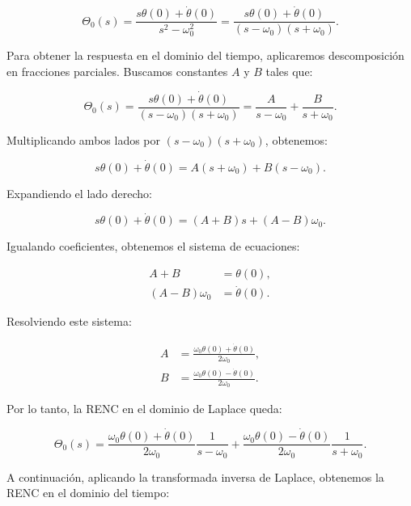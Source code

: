 \documentclass[
  11pt,
  letterpaper,
   addpoints,
   answers
  ]{exam}
\begin{document}
\begin{questions}
\begin{solution}
\begin{equation}
\Theta_0(s) = \frac{s\theta(0) + \dot{\theta}(0)}{s^2 - \omega_0^2} = \frac{s\theta(0) + \dot{\theta}(0)}{(s - \omega_0)(s + \omega_0)}.
\end{equation}

Para obtener la respuesta en el dominio del tiempo, aplicaremos descomposición en fracciones parciales. Buscamos constantes \(A\) y \(B\) tales que:

\begin{equation}
\Theta_0(s) = \frac{s\theta(0) + \dot{\theta}(0)}{(s - \omega_0)(s + \omega_0)} = \frac{A}{s - \omega_0} + \frac{B}{s + \omega_0}.
\end{equation}

Multiplicando ambos lados por \((s - \omega_0)(s + \omega_0)\), obtenemos:

\begin{equation}
s\theta(0) + \dot{\theta}(0) = A(s + \omega_0) + B(s - \omega_0).
\end{equation}

Expandiendo el lado derecho:

\begin{equation}
s\theta(0) + \dot{\theta}(0) = (A + B)s + (A - B)\omega_0.
\end{equation}

Igualando coeficientes, obtenemos el sistema de ecuaciones:

\begin{align}
A + B &= \theta(0), \\
(A - B)\omega_0 &= \dot{\theta}(0).
\end{align}

Resolviendo este sistema:

\begin{align}
A &= \frac{\omega_0\theta(0) + \dot{\theta}(0)}{2\omega_0}, \\
B &= \frac{\omega_0\theta(0) - \dot{\theta}(0)}{2\omega_0}.
\end{align}

Por lo tanto, la RENC en el dominio de Laplace queda:

\begin{equation}
\Theta_0(s) = \frac{\omega_0\theta(0) + \dot{\theta}(0)}{2\omega_0} \frac{1}{s - \omega_0} + \frac{\omega_0\theta(0) - \dot{\theta}(0)}{2\omega_0} \frac{1}{s + \omega_0}.
\end{equation}

A continuación, aplicando la transformada inversa de Laplace, obtenemos la RENC en el dominio del tiempo:


\end{solution}
\end{questions}
\end{document}
